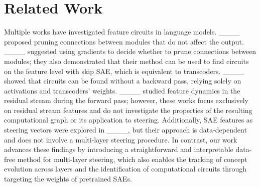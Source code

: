 \section{Related Work}
Multiple works have investigated feature circuits in language models. ____ proposed pruning connections between modules that do not affect the output. ____ suggested using gradients to decide whether to prune connections between modules; they also demonstrated that their method can be used to find circuits on the feature level with skip SAE, which is equivalent to transcoders. ____ showed that circuits can be found without a backward pass, relying solely on activations and transcoders' weights. ____ studied feature dynamics in the residual stream during the forward pass; however, these works focus exclusively on residual stream features and do not investigate the properties of the resulting computational graph or its application to steering. Additionally, SAE features as steering vectors were explored in ____, but their approach is data-dependent and does not involve a multi-layer steering procedure. In contrast, our work advances these findings by introducing a straightforward and interpretable data-free method for multi-layer steering, which also enables the tracking of concept evolution across layers and the identification of computational circuits through targeting the weights of pretrained SAEs.